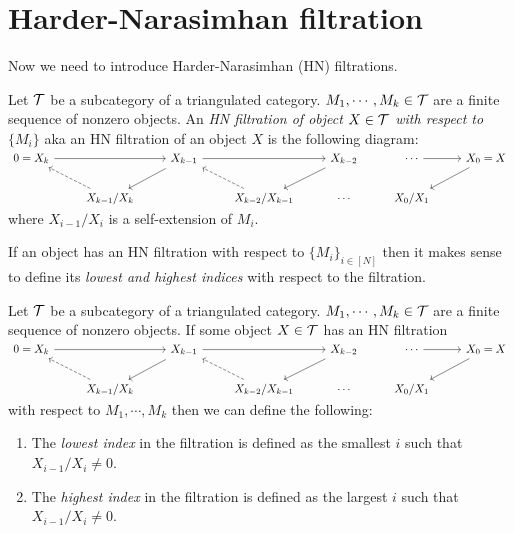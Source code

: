 \section{Harder-Narasimhan filtration}
\indent Now we need to introduce Harder-Narasimhan (HN) filtrations.\\
\begin{definition}
Let $\mathcal{T}$ be a subcategory of a triangulated category. $M_1,\cdots, M_k\in \mathcal{T}$ are a finite sequence of nonzero objects.  An \textit{HN filtration of object $X\in\mathcal{T}$ with respect to $\{M_i\}$} aka an HN filtration of an object $X$ is the following diagram:\\
$\begin{tikzcd}
0 = X_k\arrow[rr] &                               & X_{k-1}\arrow[ld]\arrow[rr]&                & X_{k-2}\arrow[ld]& \cdots & X_0 = X\arrow[ld]\arrow[l,leftarrow]\\
                            & X_{k-1}/X_k\arrow[lu, dashrightarrow] &        & X_{k-2}/X_{k-1}\arrow[lu, dashrightarrow] & \cdots & X_0/X_1&
\end{tikzcd}$
where $X_{i-1}/X_i$ is a self-extension of $M_i$. 
\end{definition}
\indent If an object has an HN filtration with respect to $\{M_i\}_{i\in[N]}$ then it makes sense to define its \textit{lowest and highest indices} with respect to the filtration.\\
\begin{definition}
Let $\mathcal{T}$ be a subcategory of a triangulated category. $M_1,\cdots, M_k\in \mathcal{T}$ are a finite sequence of nonzero objects. If some object $X\in\mathcal{T}$ has an HN filtration $\begin{tikzcd}
0 = X_k\arrow[rr] &                               & X_{k-1}\arrow[ld]\arrow[rr]&                & X_{k-2}\arrow[ld]& \cdots & X_0 = X\arrow[ld]\arrow[l,leftarrow]\\
                            & X_{k-1}/X_k\arrow[lu, dashrightarrow] &        & X_{k-2}/X_{k-1}\arrow[lu, dashrightarrow] & \cdots & X_0/X_1&
\end{tikzcd}$ with respect to $M_1,\cdots, M_k$ then we can define the following:
\begin{enumerate}
\item The \textit{lowest index} in the filtration is defined as the smallest $i$ such that $X_{i-1}/X_i\neq 0$.
\item The \textit{highest index} in the filtration is defined as the largest $i$ such that $X_{i-1}/X_i\neq 0$.
\end{enumerate}
\end{definition}
